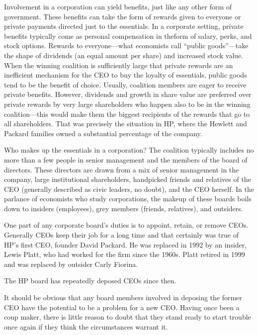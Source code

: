 \documentclass[10pt]{article}
\begin{document}
{\large Involvement in a corporation can yield benefits, just like any other
form of government. These benefits can take the form of rewards given to everyone
or private payments directed just to the essentials. In a corporate setting,
private benefits typically come as personal compensation in theform of salary,
perks, and stock options. Rewards to everyone---what economists call ``public
goods''---take the shape of dividends (an equal amount per share) and increased
stock value. When the winning coalition is sufficiently large that private
rewards are an inefficient mechanism for the CEO to buy the loyalty of
essentials, public goods tend to be the benefit of choice. Usually, coalition
members are eager to receive private benefits. However, dividends and growth in
share value are preferred over private rewards by very large shareholders who
happen also to be in the winning coalition---this would make them the biggest
recipients of the rewards that go to all shareholders. That was precisely the
situation in HP, where the Hewlett and Packard families owned a substantial
percentage of the company.}

{\large Who makes up the essentials in a corporation? The coalition typically
includes no more than a few people in senior management and the members of the
board of directors. These directors are drawn from a mix of senior management in
the company, large institutional shareholders, handpicked friends and relatives
of the CEO (generally described as civic leaders, no doubt), and the CEO herself.
In the parlance of economists who study corporations, the makeup of these boards
boils down to insiders (employees), grey members (friends, relatives), and
outsiders.}

{\large One part of any corporate board's duties is to appoint, retain, or
remove CEOs. Generally CEOs keep their job for a long time and that certainly was
true of HP's first CEO, founder David Packard. He was replaced in 1992 by an
insider, Lewis Platt, who had worked for the firm since the 1960s. Platt retired
in 1999 and was replaced by outsider Carly Fiorina.}

{\large The HP board has repeatedly deposed CEOs since then.}

{\large It should be obvious that any board members involved in deposing the
former CEO have the potential to be a problem for a new CEO. Having once been a
coup maker, there is little reason to doubt that they stand ready to start
trouble once again if they think the circumstances warrant it.}
\end{document}
